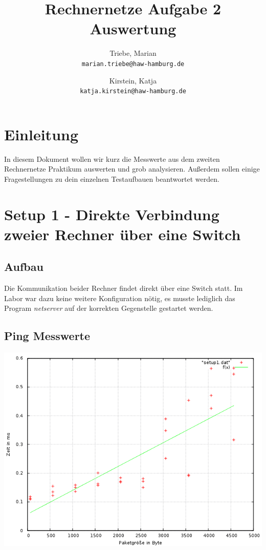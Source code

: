 \documentclass[a4paper,10pt]{article}
\title{Rechnernetze Aufgabe 2 Auswertung}
\author{
  Triebe, Marian\\
  \texttt{marian.triebe@haw-hamburg.de}
  \and
  Kirstein, Katja\\
  \texttt{katja.kirstein@haw-hamburg.de}
}
\begin{document}
\maketitle
\tableofcontents
\newpage

\section{Einleitung}
In diesem Dokument wollen wir kurz die Messwerte aus dem
zweiten Rechnernetze Praktikum auswerten und grob analysieren. Außerdem sollen
einige Fragestellungen zu dein einzelnen Testaufbauen beantwortet werden.


\section{Setup 1 - Direkte Verbindung zweier Rechner über eine Switch}

\subsection{Aufbau}
Die Kommunikation beider Rechner findet direkt über eine Switch statt. Im Labor war dazu keine weitere Konfiguration nötig, es musste
lediglich das Program \textit{netserver} auf der korrekten Gegenstelle gestartet werden.

\subsection{Ping Messwerte}
\includegraphics[scale=0.75]{ping_setup1.png}
\end{document}
